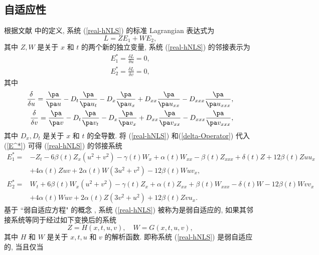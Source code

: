 \subsection{自适应性}
根据文献 \cite{INH07,INH06} 中的定义, 系统 (\ref{real-hNLS}) 的标准 Lagrangian 表达式为
\begin{equation}\label{Lagrange}
L=ZE_1+WE_2,
\end{equation}
其中 $Z, W$ 是关于 $x$ 和 $t$ 的两个新的独立变量, 系统 (\ref{real-hNLS}) 的邻接表示为
\begin{equation}\label{E^*}
\begin{aligned}
E_1^*=\frac{\delta L}{\delta u}=0,\\
E_2^*=\frac{\delta L}{\delta v}=0,
\end{aligned}
\end{equation}
其中
\begin{equation}\label{delta-Operator}
\begin{aligned}
\frac{\delta}{\delta u}=\frac{\pa}{\pa u}-D_t\frac{\pa}{\pa u_t}-D_x\frac{\pa}{\pa u_x}+D_{xx}\frac{\pa}{\pa u_{xx}}-D_{xxx}\frac{\pa}{\pa u_{xxx}},\\
\frac{\delta}{\delta v}=\frac{\pa}{\pa v}-D_t\frac{\pa}{\pa v_t}-D_x\frac{\pa}{\pa v_x}+D_{xx}\frac{\pa}{\pa v_{xx}}-D_{xxx}\frac{\pa}{\pa v_{xxx}},
\end{aligned}
\end{equation}
其中 $D_x, D_t$ 是关于 $x$ 和 $t$ 的全导数. 将 (\ref{real-hNLS}) 和(\ref{delta-Operator}) 代入 (\ref{E^*}) 可得 (\ref{real-hNLS}) 的邻接系统
\begin{equation}
\begin{aligned}
E_1^*=&-Z_t-6\beta(t)Z_x(u^2+v^2)-\gamma(t)W_x+\alpha(t)W_{xx}-\beta(t)Z_{xxx}+\delta(t)Z +12\beta(t)Z uu_x\\
&+4\alpha(t)Zuv+2\alpha(t)W(3u^2+v^2)-12\beta(t)Wuv_x,\\
E_2^*=&W_t+6\beta(t)W_x(u^2+v^2)-\gamma(t)Z_x+\alpha(t)Z_{xx}+\beta(t)W_{xxx}-\delta(t)W -12\beta(t)W vv_x\\
&+4\alpha(t)Wuv+2\alpha(t)Z(3v^2+u^2)+12\beta(t)Zvu_x.
\end{aligned}
\end{equation}
基于 ``弱自适应方程" 的概念 , 系统 (\ref{real-hNLS}) 被称为是弱自适应的, 如果其邻接系统等同于经过如下变换后的系统
\begin{equation}\label{ZW}
Z=H(x,t,u,v),\quad W=G(x,t,u,v),
\end{equation}
其中 $H$ 和 $W$ 是关于 $x, t, u$ 和 $v$ 的解析函数. 即称系统 (\ref{real-hNLS}) 是弱自适应的, 当且仅当
